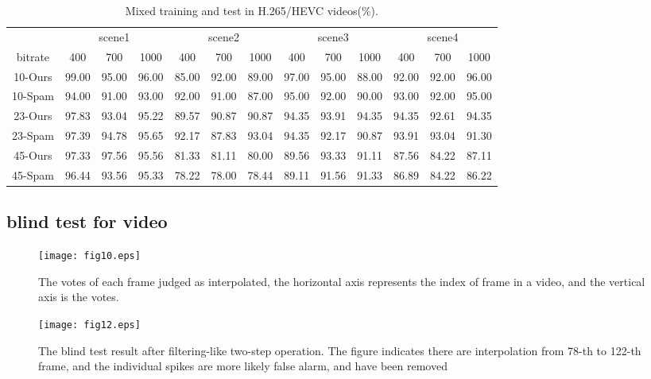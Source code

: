 \documentclass[pdftex,twocolumn,epjc3]{svjour3}          %
\begin{document}
\begin{table*}[b]
\renewcommand\arraystretch{1.5}
    \caption{Mixed training and test in H.265/HEVC videos(\%).}\label{table:7}
    \begin{center}
        \begin{tabular*}{14.5cm}{ccccccccccccc}
            \hline
            \ & \multicolumn{3}{c}{scene1} & \multicolumn{3}{c}{scene2} & \multicolumn{3}{c}{scene3} &\multicolumn{3}{c}{scene4} \\ \cline{2-4}\cline{5-7}\cline{8-10}\cline{11-13}
            bitrate & 400 & 700 & 1000 & 400 & 700 & 1000 & 400 & 700 & 1000 & 400 & 700 & 1000 \\ \hline
            10-Ours & 99.00 & 95.00 & 96.00 & 85.00 & 92.00 & 89.00 & 97.00 & 95.00 & 88.00 & 92.00 & 92.00 & 96.00 \\
            10-Spam & 94.00 & 91.00 & 93.00 & 92.00 & 91.00 & 87.00 & 95.00 & 92.00 & 90.00 & 93.00 & 92.00 & 95.00 \\ \hline
            23-Ours & 97.83 & 93.04 & 95.22 & 89.57 & 90.87 & 90.87 & 94.35 & 93.91 & 94.35 & 94.35 & 92.61 & 94.35 \\
            23-Spam & 97.39 & 94.78 & 95.65 & 92.17 & 87.83 & 93.04 & 94.35 & 92.17 & 90.87 & 93.91 & 93.04 & 91.30 \\ \hline
            45-Ours & 97.33 & 97.56 & 95.56 & 81.33 & 81.11 & 80.00 & 89.56 & 93.33 & 91.11 & 87.56 & 84.22 & 87.11\\
            45-Spam & 96.44 & 93.56 & 95.33 & 78.22 & 78.00 & 78.44 & 89.11 & 91.56 & 91.33 & 86.89 & 84.22 & 86.22
            \\ \hline
        \end{tabular*}
    \end{center}
\end{table*}

\subsection{blind test for video}
\begin{figure}[!t]
 \texttt{[image: fig10.eps]}
 \caption{The votes of each frame judged as interpolated, the horizontal axis represents the index of frame in a video, and the vertical axis is the votes.}\label{fig:10}
\end{figure}

\begin{figure}[!t]
 \texttt{[image: fig12.eps]}
 \caption{The blind test result after filtering-like two-step operation. The figure indicates there are interpolation from 78-th to 122-th frame, and the individual spikes are more likely false alarm, and have been removed}\label{fig:11}
\end{figure}
\end{document}

